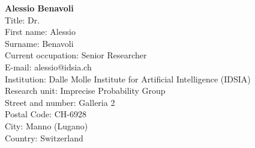 \documentclass[11pt,dvipsnames,usenames,a4paper]{article}
\begin{document}

{\bf Alessio Benavoli}\\
Title: Dr.\\
First name: Alessio\\
Surname:  Benavoli\\
Current occupation: Senior Researcher \\
E-mail: alessio@idsia.ch\\
Institution: Dalle Molle Institute for Artificial Intelligence (IDSIA)\\
Research unit: Imprecise Probability Group\\
Street and number: Galleria 2\\
Postal Code: CH-6928\\
City: Manno (Lugano)\\
Country: Switzerland\\[-7pt]

\end{document}
